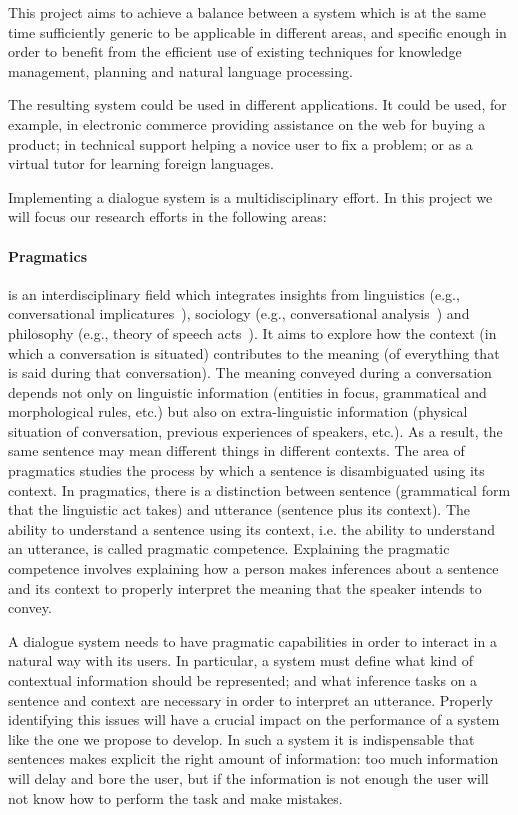 This project aims to achieve a balance between a system which is at the 
same time sufficiently generic to be applicable in different areas, and 
specific enough in order to benefit from the efficient use of existing 
techniques for knowledge management, planning and natural language processing.

The resulting system could be used in different applications. It could be used, 
for example, in electronic commerce providing 
assistance on the web for buying a product; in technical support helping a
novice user to fix a problem; or as a virtual tutor for learning foreign 
languages. 

Implementing a dialogue system is a multidisciplinary effort. In this project
we will focus our research efforts in the following areas:

\paragraph{Pragmatics} is an interdisciplinary field which
integrates insights from linguistics (e.g., 
conversational implicatures~\cite{grice75}),
sociology (e.g., conversational analysis~\cite{schegloff87b}) and
philosophy (e.g., theory of speech acts~\cite{austin62}). It aims to explore how
the context (in which a conversation is situated) contributes to the meaning (of
everything that is said during that conversation). The meaning conveyed during
a conversation depends not only on linguistic information (entities in focus,
grammatical and morphological rules, etc.) but also on extra-linguistic
information (physical situation of conversation, previous
experiences of speakers, etc.). As a result, the same sentence may mean
different things in different contexts. The area of pragmatics studies the
process by which a sentence is disambiguated using its context. In pragmatics,
there is a distinction between sentence (grammatical form that
the linguistic act takes) and utterance (sentence plus its context). The ability
to understand a sentence using its context, i.e. the ability to understand an
utterance, is called pragmatic competence. Explaining the pragmatic competence
involves explaining how a person makes inferences about a sentence and its
context to properly interpret the meaning that the speaker intends to convey.

A dialogue system needs to have pragmatic capabilities in order to interact in a
natural way with its users. In particular, a system must define what kind of
contextual information should be represented; and what inference tasks on a
sentence and context are necessary in order to interpret an utterance. Properly 
identifying this issues will have a crucial impact on the performance of a system
like the one we propose to develop. In such a system it is indispensable that
sentences makes explicit the right amount of information: too much information
will delay and bore the user, but if the information is not enough the user 
will not know how to perform the task and make mistakes.

